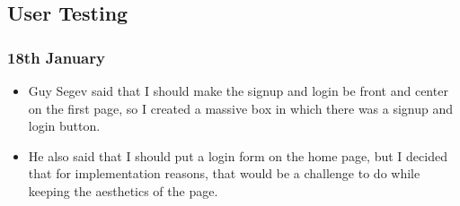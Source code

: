 \subsection{User Testing}

\subsubsection{18th January}
\begin{itemize}
    \item Guy Segev said that I should make the signup and login be front and center on the first page, so I created a massive box in which there was a signup and login button.
    \item He also said that I should put a login form on the home page, but I decided that for implementation reasons, that would be a challenge to do while keeping the aesthetics of the page.
\end{itemize}